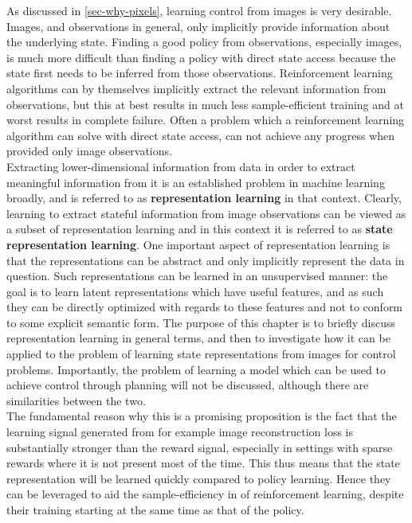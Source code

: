 As discussed in \ref{sec-why-pixels}, learning control from images is 
very desirable. Images, and observations in general, only implicitly 
provide information about the underlying state. 
Finding a good policy from observations, especially images,
is much more difficult than finding a policy with direct state access
because the state first needs to be inferred from those observations.
Reinforcement learning algorithms can by themselves implicitly extract
the relevant information from observations, but this at best results
in much less sample-efficient training and at worst results
in complete failure.
Often a problem which a reinforcement learning algorithm can solve
with direct state access, can not achieve any progress when
provided only image observations. \\

Extracting lower-dimensional information from data in order to extract
meaningful information from it is an established problem in machine learning broadly,
and is referred to as \textbf{representation learning} in that context.
Clearly, learning to extract stateful information from image observations
can be viewed as a subset of representation learning
and in this context it is referred to as \textbf{state representation learning}.
One important aspect of representation learning is that the representations
can be abstract and only implicitly represent the data in question.
Such representations can be learned in an unsupervised manner:
the goal is to learn latent representations which have useful features,
and as such they can be directly optimized with regards to these features
and not to conform to some explicit semantic form.
The purpose of this chapter is to briefly discuss representation learning
in general terms, and then to investigate how it can be applied
to the problem of learning state representations from images for control problems. 
Importantly, the problem of learning a model 
which can be used to achieve control through planning will not be discussed,
although there are similarities between the two.\\

The fundamental reason why this is a promising proposition is
the fact that the learning signal generated from for example
image reconstruction loss is substantially stronger than the reward signal,
especially in settings with sparse rewards where it is 
not present most of the time.
This thus means that the state representation will be learned quickly
compared to policy learning. Hence they can be leveraged to
aid the sample-efficiency in of reinforcement learning, 
despite their training starting at the same time as that of the policy.

